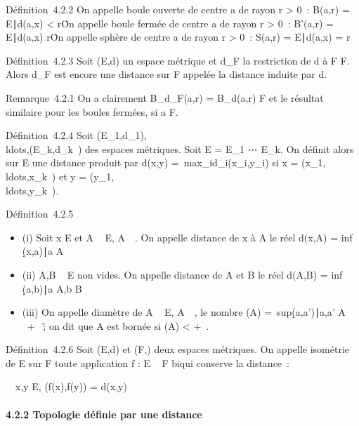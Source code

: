 \documentclass[]{article}
\begin{document}
Définition~4.2.2 On appelle boule ouverte de centre a de rayon r
\textgreater{} 0~: B(a,r) = \x \in
E∣d(a,x) \textless{} r\.

On appelle boule fermée de centre a de rayon r \textgreater{} 0~:
B'(a,r) = \x \in E∣d(a,x) \leq
r\.

On appelle sphère de centre a de rayon r \textgreater{} 0~: S(a,r) =
\x \in E∣d(a,x) =
r\

Définition~4.2.3 Soit (E,d) un espace métrique et d\_F la
restriction de d à F \times F. Alors d\_F est encore une distance sur
F appelée la distance induite par d.

Remarque~4.2.1 On a clairement B\_d\_F(a,r) =
B\_d(a,r) \bigcap F et le résultat similaire pour les boules fermées,
si a \in F.

Définition~4.2.4 Soit
(E\_1,d\_1),\\ldots,(E\_k,d\_k~)
des espaces métriques. Soit E = E\_1
\times⋯ \times E\_k. On définit alors sur E une
distance produit par d(x,y) =\
max\_id\_i(x\_i,y\_i) si x =
(x\_1,\\ldots,x\_k~)
et y =
(y\_1,\\ldots,y\_k~).

Définition~4.2.5

\begin{itemize}
\itemsep1pt\parskip0pt
\item
  (i) Soit x \in E et A \subset~ E, A\neq~\varnothing~. On appelle
  distance de x à A le réel d(x,A) = inf~
  \d(x,a)∣a \in
  A\
\item
  (ii) A,B \subset~ E non vides. On appelle distance de A et B le réel d(A,B)
  = inf~
  \d(a,b)∣a \in A,b \in
  B\
\item
  (iii) On appelle diamètre de A \subset~ E, A\neq~\varnothing~, le
  nombre \delta(A) =\
  sup\d(a,a')∣a,a' \in
  A\ \in {}~ \cup\ + \infty~\~; on
  dit que A est bornée si \delta(A) \textless{} +\infty~.
\end{itemize}

Définition~4.2.6 Soit (E,d) et (F,\delta) deux espaces métriques. On appelle
isométrie de E sur F toute application f : E \rightarrow~ F bi\jmathective qui conserve
la distance~:

\forall~~x,y \in E, \delta(f(x),f(y)) = d(x,y)

\paragraph{4.2.2 Topologie définie par une distance}
\end{document}
